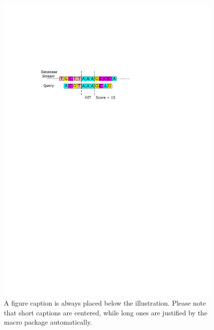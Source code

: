 \begin{figure}
\includegraphics[width=\textwidth]{Figures/Algorithm2.pdf}
\caption{A figure caption is always placed below the illustration.
Please note that short captions are centered, while long ones are
justified by the macro package automatically.} \label{fig1}
\end{figure}
